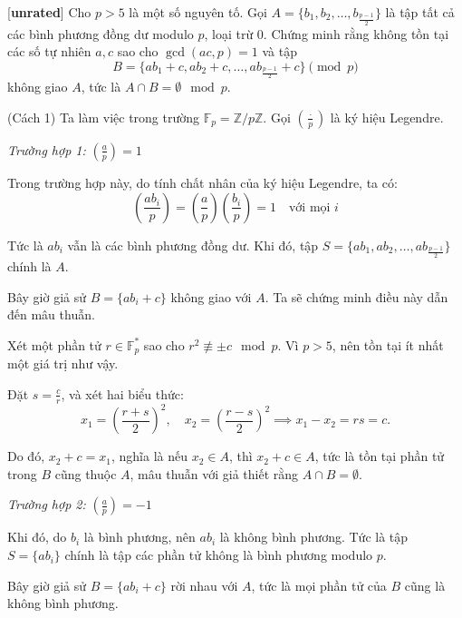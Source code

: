 \documentclass[../08-quadratic-residues.tex]{subfiles}
\begin{document}
\begin{example*}\label{example:IRN-2015-N3}[\textbf{unrated}]
	Cho \( p > 5 \) là một số nguyên tố. Gọi \( A = \{b_1, b_2, \dots, b_{\frac{p-1}{2}}\} \)
	là tập tất cả các bình phương đồng dư modulo \( p \), loại trừ 0.
	Chứng minh rằng không tồn tại các số tự nhiên \( a, c \) sao cho \( \gcd(ac, p) = 1 \) và tập
	\[
		B = \{ab_1 + c, ab_2 + c, \dots, ab_{\frac{p-1}{2}} + c\} \pmod{p}
	\]
	không giao \( A \), tức là \( A \cap B = \emptyset \mod{p} \).
\end{example*}

\begin{soln}(Cách 1)\footnotemark
	Ta làm việc trong trường \( \mathbb{F}_p = \mathbb{Z}/p\mathbb{Z} \). Gọi \( \left( \frac{\cdot}{p} \right) \) là ký hiệu Legendre.

	\textit{Trường hợp 1:} \( \left( \frac{a}{p} \right) = 1 \)
	
	Trong trường hợp này, do tính chất nhân của ký hiệu Legendre, ta có:
	\[
		\left( \frac{ab_i}{p} \right) = \left( \frac{a}{p} \right) \left( \frac{b_i}{p} \right) = 1 \quad \text{với mọi } i
	\]
	
	Tức là \( ab_i \) vẫn là các bình phương đồng dư. Khi đó, tập \( S = \{ab_1, ab_2, \dots, ab_{\frac{p-1}{2}}\} \) chính là \( A \).
	
	Bây giờ giả sử \( B = \{ab_i + c\} \) không giao với \( A \). Ta sẽ chứng minh điều này dẫn đến mâu thuẫn.
	
	Xét một phần tử \( r \in \mathbb{F}_p^* \) sao cho \( r^2 \not\equiv \pm c \mod{p} \). Vì \( p > 5 \), nên tồn tại ít nhất một giá trị như vậy.
	
	Đặt \( s = \frac{c}{r} \), và xét hai biểu thức:
	\[
		x_1 = \left( \frac{r + s}{2} \right)^2, \quad x_2 = \left( \frac{r - s}{2} \right)^2 \implies x_1 - x_2 = rs = c.
	\]

	Do đó, \( x_2 + c = x_1 \), nghĩa là nếu \( x_2 \in A \), thì \( x_2 + c \in A \), tức là tồn tại phần tử trong \( B \) cũng thuộc \( A \),
	mâu thuẫn với giả thiết rằng \( A \cap B = \emptyset \).
	
	\textit{Trường hợp 2:} \( \left( \frac{a}{p} \right) = -1 \)
	
	Khi đó, do \( b_i \) là bình phương, nên \( ab_i \) là không bình phương. Tức là tập \( S = \{ab_i\} \) chính là tập các phần tử không là bình phương modulo \( p \).
	
	Bây giờ giả sử \( B = \{ab_i + c\} \) rời nhau với \( A \), tức là mọi phần tử của \( B \) cũng là không bình phương.
	

\end{soln}
\end{document}
